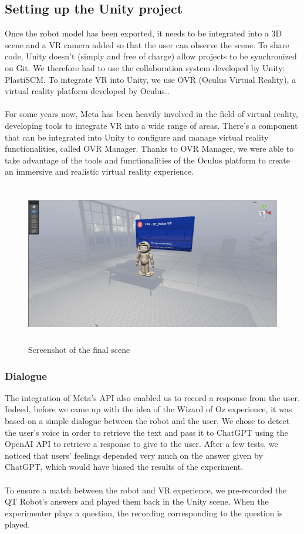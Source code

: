 \subsection{Setting up the Unity project}
Once the robot model has been exported, it needs to be integrated into a 3D scene and a VR camera added so that the user can observe the scene. To share code, Unity doesn't (simply and free of charge) allow projects to be synchronized on Git. We therefore had to use the collaboration system developed by Unity: PlastiSCM. To integrate VR into Unity, we use OVR (Oculus Virtual Reality), a virtual reality platform developed by Oculus..\\
\\
For some years now, Meta has been heavily involved in the field of virtual reality, developing tools to integrate VR into a wide range of areas. There's a component that can be integrated into Unity to configure and manage virtual reality functionalities, called OVR Manager. Thanks to OVR Manager, we were able to take advantage of the tools and functionalities of the Oculus platform to create an immersive and realistic virtual reality experience. \\ 

\begin{figure}[!h]
\centering
\includegraphics[height=7cm]{Figures/Scene_3D.png}
\caption{Screenshot of the final scene}
\end{figure}

\subsubsection{Dialogue}
The integration of Meta's API also enabled us to record a response from the user. Indeed, before we came up with the idea of the Wizard of Oz experience, it was based on a simple dialogue between the robot and the user. We chose to detect the user's voice in order to retrieve the text and pass it to ChatGPT using the OpenAI API to retrieve a response to give to the user. After a few tests, we noticed that users' feelings depended very much on the answer given by ChatGPT, which would have biased the results of the experiment. \\
\\
To ensure a match between the robot and VR experience, we pre-recorded the QT Robot's answers and played them back in the Unity scene. When the experimenter plays a question, the recording corresponding to the question is played.\\

